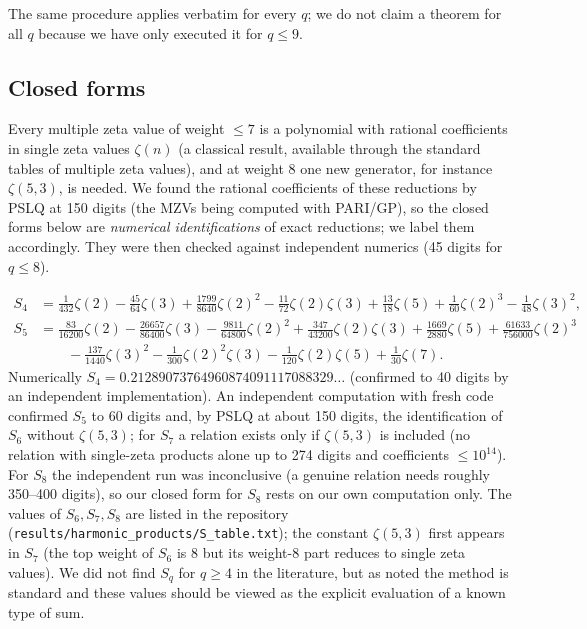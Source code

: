 The same procedure applies verbatim for every $q$; we do not claim a theorem for all $q$ because we have only executed it for $q\le9$.

\subsection{Closed forms}
Every multiple zeta value of weight $\le7$ is a polynomial with rational coefficients in single zeta values $\zeta(n)$ (a classical result, available through the standard tables of multiple zeta values), and at weight $8$ one new generator, for instance $\zeta(5,3)$, is needed. We found the rational coefficients of these reductions by PSLQ at 150 digits (the MZVs being computed with PARI/GP), so the closed forms below are \emph{numerical identifications} of exact reductions; we label them accordingly. They were then checked against independent numerics (45 digits for $q\le8$).

\begin{align*}
S_4&=\tfrac1{432}\zeta(2)-\tfrac{45}{64}\zeta(3)+\tfrac{1799}{8640}\zeta(2)^2-\tfrac{11}{72}\zeta(2)\zeta(3)+\tfrac{13}{18}\zeta(5)+\tfrac1{60}\zeta(2)^3-\tfrac1{48}\zeta(3)^2,\\
S_5&=\tfrac{83}{16200}\zeta(2)-\tfrac{26657}{86400}\zeta(3)-\tfrac{9811}{64800}\zeta(2)^2+\tfrac{347}{43200}\zeta(2)\zeta(3)+\tfrac{1669}{2880}\zeta(5)+\tfrac{61633}{756000}\zeta(2)^3\\
&\qquad-\tfrac{137}{1440}\zeta(3)^2-\tfrac1{300}\zeta(2)^2\zeta(3)-\tfrac1{120}\zeta(2)\zeta(5)+\tfrac1{30}\zeta(7).
\end{align*}
Numerically $S_4=0.21289073764960874091117088329\ldots$ (confirmed to 40 digits by an independent implementation). An independent computation with fresh code confirmed $S_5$ to 60 digits and, by PSLQ at about 150 digits, the identification of $S_6$ without $\zeta(5,3)$; for $S_7$ a relation exists only if $\zeta(5,3)$ is included (no relation with single-zeta products alone up to 274 digits and coefficients $\le10^{14}$). For $S_8$ the independent run was inconclusive (a genuine relation needs roughly 350--400 digits), so our closed form for $S_8$ rests on our own computation only. The values of $S_6,S_7,S_8$ are listed in the repository (\texttt{results/harmonic\_products/S\_table.txt}); the constant $\zeta(5,3)$ first appears in $S_7$ (the top weight of $S_6$ is $8$ but its weight-$8$ part reduces to single zeta values). We did not find $S_q$ for $q\ge4$ in the literature, but as noted the method is standard and these values should be viewed as the explicit evaluation of a known type of sum.


